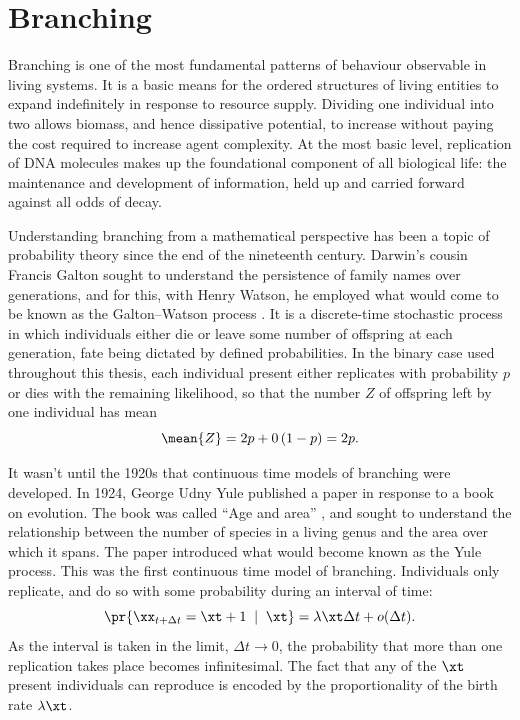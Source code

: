 \section{Branching}

Branching is one of the most fundamental patterns of behaviour observable in
living systems. It is a basic means for the ordered structures of living
entities to expand indefinitely in response to resource supply. Dividing one
individual into two allows biomass, and hence dissipative potential, to
increase without paying the cost required to increase agent complexity. At the
most basic level, replication of DNA molecules makes up the foundational
component of all biological life: the maintenance and development of
information, held up and carried forward against all odds of decay.

Understanding branching from a mathematical perspective has been a topic of
probability theory since the end of the nineteenth century. Darwin's cousin
Francis Galton sought to understand the persistence of family names over
generations, and for this, with Henry Watson, he employed what would come to be
known as the Galton--Watson process \cite{watson1875probability}. It is a
discrete-time stochastic process in which individuals either die or leave some
number of offspring at each generation, fate being dictated by defined
probabilities. In the binary case used throughout this thesis, each individual
present either replicates with probability $p$ or dies with the remaining
likelihood, so that the number $Z$ of offspring left by one individual has mean
\[
\mean{Z} = 2p + 0\,(1-p) = 2p .
\]

It wasn't until the 1920s that continuous time models of branching were
developed. In 1924, George Udny Yule published a paper in response to a book on
evolution. The book was called ``Age and area'' \cite{Willis1922}, and sought to understand the
relationship between the number of species in a living genus and the area over
which it spans. The paper \cite{yule1925ii} introduced what would become known
as the Yule process. This was the first continuous time model of branching.
Individuals only replicate, and do so with some probability during an interval
of time:
$$\pr{\xx_{t + \Delta t}  = \xt + 1 \;\; | \;\; \xt} = \lambda \xt \Delta t + o(\Delta t).$$
As the interval is taken in the limit, $\Delta t\to 0$, the probability that
more than one replication takes place becomes infinitesimal. The fact that any
of the $\xt$ present individuals can reproduce is encoded by the
proportionality of the birth rate $\lambda \xt$.

